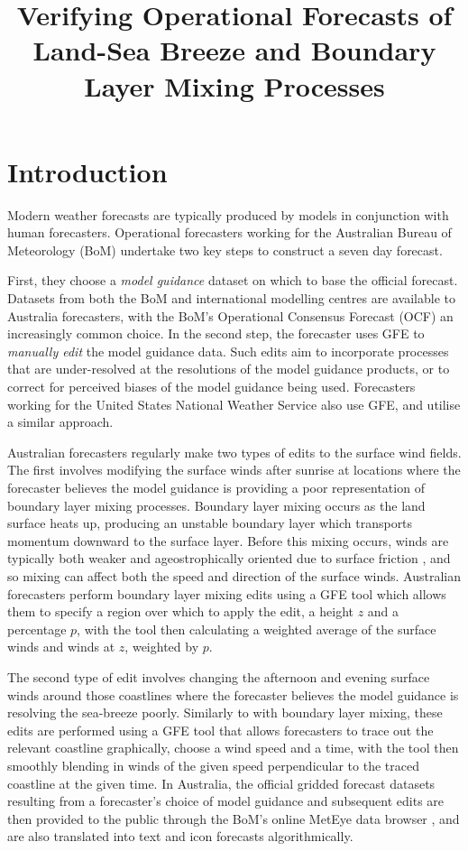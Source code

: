 \documentclass{ametsoc}
\title{Verifying Operational Forecasts of Land-Sea Breeze and Boundary Layer Mixing Processes}
\affiliation{School of Earth Sciences, and ARC Centre of Excellence for Climate Extremes, The University of Melbourne, Melbourne, Victoria, Australia.}
\begin{document}
\maketitle

\section{Introduction}
\label{Sec:Introduction}
Modern weather forecasts are typically produced by models in conjunction with human forecasters. Operational forecasters working for the Australian Bureau of Meteorology (BoM) undertake two key steps to construct a seven day forecast.

First, they choose a \textit{model guidance} dataset on which to base the official forecast. Datasets from both the BoM and international modelling centres are available to Australia forecasters, with the BoM's Operational Consensus Forecast (OCF) an increasingly common choice. In the second step, the forecaster uses GFE to \textit{manually edit} the model guidance data. Such edits aim to incorporate processes that are under-resolved at the resolutions of the model guidance products, or to correct for perceived biases of the model guidance being used. Forecasters working for the United States National Weather Service also use GFE, and utilise a similar approach. 

Australian forecasters regularly make two types of edits to the surface wind fields. The first involves modifying the surface winds after sunrise at locations where the forecaster believes the model guidance is providing a poor representation of boundary layer mixing processes. Boundary layer mixing occurs as the land surface heats up, producing an unstable boundary layer which transports momentum downward to the surface layer. Before this mixing occurs, winds are typically both weaker and ageostrophically oriented due to surface friction \citep{lee18}, and so mixing can affect both the speed and direction of the surface winds. Australian forecasters perform boundary layer mixing edits using a GFE tool which allows them to specify a region over which to apply the edit, a height $z$ and a percentage $p$, with the tool then calculating a weighted average of the surface winds and winds at $z$, weighted by $p$.

The second type of edit involves changing the afternoon and evening surface winds around those coastlines where the forecaster believes the model guidance is resolving the sea-breeze poorly. Similarly to with boundary layer mixing, these edits are performed using a GFE tool that allows forecasters to trace out the relevant coastline graphically, choose a wind speed and a time, with the tool then smoothly blending in winds of the given speed perpendicular to the traced coastline at the given time. In Australia, the official gridded forecast datasets resulting from a forecaster's choice of model guidance and subsequent edits are then provided to the public through the BoM's online MetEye data browser \citep{bomMetEye19}, and are also translated into text and icon forecasts algorithmically. 
\end{document}
